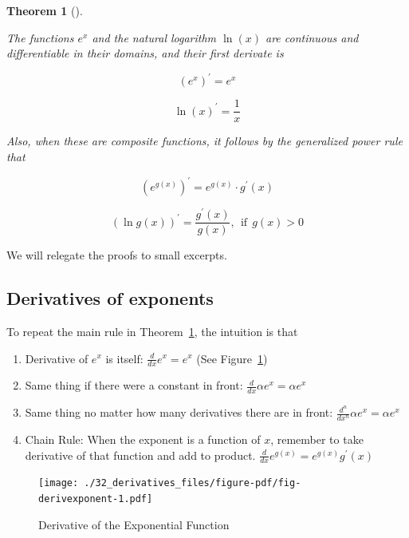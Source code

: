 \documentclass[
  letterpaper,
]{book}
\providecommand{\tightlist}{%
  \setlength{\itemsep}{0pt}\setlength{\parskip}{0pt}}\usepackage{longtable,booktabs,array}
\theoremstyle{definition}
\theoremstyle{definition}
\theoremstyle{plain}
\theoremstyle{definition}
\theoremstyle{plain}
\newtheorem{theorem}{Theorem}[chapter]
\theoremstyle{plain}
\theoremstyle{remark}
\begin{document}
\leavevmode{}%
\begin{theorem}[]\label{thm-derivexplog}

The functions \(e^x\) and the natural logarithm \(\ln(x)\) are
continuous and differentiable in their domains, and their first derivate
is

\[(e^x)^\prime = e^x\]

\[\ln(x)^\prime = \frac{1}{x}\]

Also, when these are composite functions, it follows by the generalized
power rule that

\[\left(e^{g(x)}\right)^\prime = e^{g(x)} \cdot g^\prime(x)\]

\[\left(\ln g(x)\right)^\prime = \frac{g^\prime(x)}{g(x)}, ~~\text{if}~~ g(x) > 0\]

\end{theorem}

We will relegate the proofs to small excerpts.

\hypertarget{derivatives-of-exponents}{%
\subsection*{Derivatives of exponents}\label{derivatives-of-exponents}}

To repeat the main rule in Theorem~\ref{thm-derivexplog}, the intuition
is that

\begin{enumerate}
\def\labelenumi{\arabic{enumi}.}
\tightlist
\item
  Derivative of \(e^x\) is itself: \(\frac{d}{dx}e^x = e^x\) (See
  Figure~\ref{fig-derivexponent})
\item
  Same thing if there were a constant in front:
  \(\frac{d}{dx}\alpha e^x = \alpha e^x\)
\item
  Same thing no matter how many derivatives there are in front:
  \(\frac{d^n}{dx^n} \alpha e^x = \alpha e^x\)
\item
  Chain Rule: When the exponent is a function of \(x\), remember to take
  derivative of that function and add to product.
  \(\frac{d}{dx}e^{g(x)}= e^{g(x)} g^\prime(x)\)
\end{enumerate}

\begin{figure}

{\centering \texttt{[image: ./32\_derivatives\_files/figure-pdf/fig-derivexponent-1.pdf]}

}

\caption{\label{fig-derivexponent}Derivative of the Exponential
Function}

\end{figure}
\end{document}
